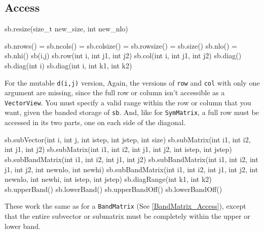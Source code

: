\documentclass[twoside,letterpaper,11pt]{article}
\renewcommand{\tt}[1]{{\lstinline {#1}}}
\begin{document}
\subsection{Access}
\label{SymBandMatrix_Access}

\begin{tmvcode}
sb.resize(size_t new_size, int new_nlo)
\end{tmvcode}

\begin{tmvcode}
sb.nrows() = sb.ncols() = sb.colsize() = sb.rowsize() = sb.size()
sb.nlo() = sb.nhi()
sb(i,j)
sb.row(int i, int j1, int j2)
sb.col(int i, int j1, int j2)
sb.diag()
sb.diag(int i)
sb.diag(int i, int k1, int k2)
\end{tmvcode}
For the mutable \tt{d(i,j)} version, 
Again, the versions of \tt{row} and \tt{col} with only one argument are
missing, since the full row or column isn't accessible as a \tt{VectorView}.
You must specify a valid range within the row or column that you want, 
given the banded storage of \tt{sb}.  And, like for \tt{SymMatrix}, a full row
must be accessed in its two parts, one on each side of the diagonal.

\begin{tmvcode}
sb.subVector(int i, int j, int istep, int jstep, int size)
sb.subMatrix(int i1, int i2, int j1, int j2)
sb.subMatrix(int i1, int i2, int j1, int j2, int istep, int jstep)
sb.subBandMatrix(int i1, int i2, int j1, int j2)
sb.subBandMatrix(int i1, int i2, int j1, int j2, int newnlo, int newhi)
sb.subBandMatrix(int i1, int i2, int j1, int j2, int newnlo, int newhi, 
      int istep, int jstep)
sb.diagRange(int k1, int k2)
sb.upperBand()
sb.lowerBand()
sb.upperBandOff()
sb.lowerBandOff()
\end{tmvcode}
These work the same as for a \tt{BandMatrix}
(See \ref{BandMatrix_Access}),
except that the entire
subvector or submatrix must be completely within the upper or lower band.
\end{document}
